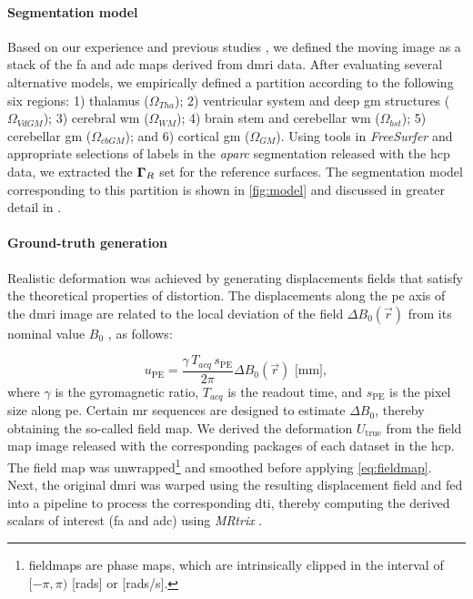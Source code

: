 \paragraph*{Segmentation model}
Based on our experience %
  and previous studies \citep{ennis_orthogonal_2006},
  we defined the moving image as a stack of the \gls*{fa} and \gls*{adc} maps derived
  from \gls*{dmri} data.
After evaluating several alternative models, we empirically defined a partition \omegaset{}
  according to the following six regions:
  1) thalamus ($\Omega_{Tha}$);
  2) ventricular system and deep \gls*{gm} structures ($\Omega_{VdGM}$);
  3) cerebral \gls*{wm} ($\Omega_{WM}$);
  4) brain stem and cerebellar \gls*{wm} ($\Omega_{bst}$);
  5) cerebellar \gls*{gm} ($\Omega_{cbGM}$); and
  6) cortical \gls*{gm} ($\Omega_{GM}$).
Using tools in \emph{FreeSurfer} and appropriate selections of labels in the
  \emph{aparc} segmentation released with the \gls*{hcp} data, we extracted the $\boldsymbol{\Gamma}_R$ set for the
  reference surfaces.
The segmentation model corresponding to this partition is shown in \autoref{fig:model}
  and discussed in greater detail in .

\paragraph*{Ground-truth generation}
Realistic deformation was achieved by generating displacements fields that satisfy the theoretical
  properties of distortion.
The displacements along the \gls*{pe} axis of the \gls*{dmri} image are related to the local
  deviation of the field $\Delta B_0(\vec{r})$ from its nominal value $B_0$  \citep{jezzard_correction_1995},
  as follows:

  \begin{equation}
  u_\text{PE} = \frac{\gamma \, T_{acq}\, s_\text{PE}}{2\pi}\Delta B_0(\vec{r})\text{ [mm]},
  \label{eq:fieldmap}
  \end{equation}
where $\gamma$ is the gyromagnetic ratio, $T_{acq}$ is the readout time, and
  $s_\text{PE}$ is the pixel size along \gls*{pe}.
Certain \gls*{mr} sequences are designed to estimate $\Delta B_0$, thereby obtaining
  the so-called field map.
We derived the deformation $U_\text{true}$ from the field map image released with
  the corresponding packages of each dataset in the \gls*{hcp}.
The field map was unwrapped\footnote{fieldmaps are phase maps, which are intrinsically clipped in the interval
  of $[-\pi, \pi)$ [rads] or [rads/s].} and smoothed before applying \eqref{eq:fieldmap}.
Next, the original \gls*{dmri} was warped using the resulting displacement field and fed into
  a pipeline to process the corresponding \gls*{dti}, thereby computing the derived scalars of
  interest (\gls*{fa} and \gls*{adc}) using \emph{MRtrix} \citep{tournier_mrtrix_2012}.

